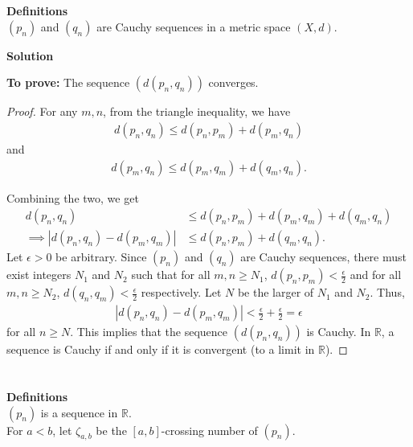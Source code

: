 \documentclass[12pt]{article}
\begin{document}
\section{}
 {\bf Definitions}\\
$(p_{n})$ and $(q_{n})$ are Cauchy sequences in a metric space $(X, d)$.

      {\bf Solution}

      {\bf To prove: }The sequence $(d(p_{n}, q_{n}))$ converges.
\begin{proof}

      For any $m, n$, from the triangle inequality, we have
      \begin{align*}
            d(p_{n}, q_{n})\le d(p_{n}, p_{m}) + d(p_{m}, q_{n})
      \end{align*}
      and
      \begin{align*}
            d(p_{m}, q_{n})\le d(p_{m}, q_{m})+d(q_{m}, q_{n}).
      \end{align*}

      Combining the two, we get
      \begin{align*}
            d(p_{n}, q_{n})                            & \le d(p_{n}, p_{m}) + d(p_{m}, q_{m})+d(q_{m}, q_{n}) \\
            \implies |d(p_{n}, q_{n})-d(p_{m}, q_{m})| & \le d(p_{n}, p_{m})+d(q_{m}, q_{n}).
      \end{align*}
      Let $\epsilon>0$ be arbitrary. Since $(p_{n})$ and $(q_{n})$ are Cauchy sequences, there must exist integers $N_{1}$ and $N_{2}$ such that for all $m, n\geq N_{1}$, $d(p_{n}, p_{m})< \frac{\epsilon}{2}$ and for all $m, n\geq N_{2}$, $d(q_{n}, q_{m})< \frac{\epsilon}{2}$ respectively. Let $N$ be the larger of $N_{1}$ and $N_{2}$. Thus,
      \begin{align*}
            |d(p_{n}, q_{n})-d(p_{m}, q_{m})| < \frac{\epsilon}{2} + \frac{\epsilon}{2} = \epsilon
      \end{align*}
      for all $n\ge N$. This implies that the sequence $(d(p_{n}, q_{n}))$ is Cauchy. In $\mathbb{R}$, a sequence is Cauchy if and only if it is convergent (to a limit in $\mathbb{R}$).
\end{proof}

\section{}
 {\bf Definitions}\\
$(p_{n})$ is a sequence in $\mathbb{R}$. \\
For $a<b$, let $\zeta_{a, b}$ be the $[a, b]$-crossing number of $(p_{n})$.
\end{document}
